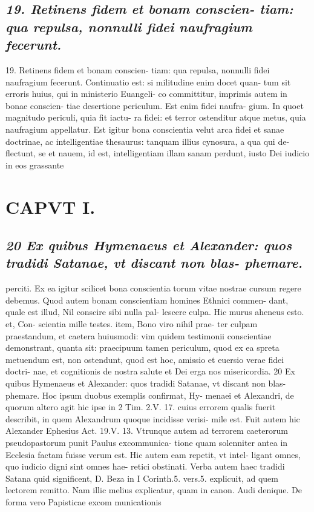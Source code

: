 \documentclass{article}
\begin{document}
\begin{pages}
\subsection*{\textit{19. Retinens fidem et bonam conscien- tiam: qua repulsa, nonnulli fidei naufragium fecerunt.}}19. Retinens fidem et bonam conscien- tiam: qua repulsa, nonnulli fidei naufragium fecerunt.  \pend\pstart Continuatio est: si militudine enim docet quan- tum sit erroris huius, qui in ministerio Euangeli- co committitur, imprimis autem in bonae conscien- tiae desertione periculum. Est enim fidei naufra- gium. In quoet magnitudo periculi, quia fit iactu- ra fidei: et terror ostenditur atque metus, quia naufragium appellatur. Est igitur bona conscientia velut arca fidei et sanae doctrinae, ac intelligentiae thesaurus: tanquam illius cynosura, a qua qui de- flectunt, se et nauem, id est, intelligentiam illam sanam perdunt, iusto Dei iudicio in eos grassante  \pend
\section*{CAPVT  I. }
\marginpar{[ p.37 ]}\pstart {}
{}
\subsection*{\textit{20 Ex quibus Hymenaeus et Alexander: quos tradidi Satanae, vt discant non blas- phemare.}}perciti. Ex ea igitur scilicet bona conscientia torum vitae nostrae cursum regere debemus. Quod autem bonam conscientiam homines Ethnici commen- dant, quale est illud, Nil conscire sibi nulla pal- lescere culpa. Hic murus aheneus esto. et, Con- scientia mille testes. item, Bono viro nihil prae- ter culpam praestandum, et caetera huiusmodi: vim quidem testimonii conscientiae demonstrant, quanta sit: praecipuum tamen periculum, quod ex ea spreta metuendum est, non ostendunt, quod est hoc, amissio et euersio verae fidei doctri- nae, et cognitionis de nostra salute et Dei erga nos misericordia. 20 Ex quibus Hymenaeus et Alexander: quos tradidi Satanae, vt discant non blas- phemare. Hoc ipsum duobus exemplis confirmat, Hy- menaei et Alexandri, de quorum altero agit hic ipse in 2 Tim. 2.V. 17. cuius errorem qualis fuerit describit, in quem Alexandrum quoque incidisse verisi- mile est. Fuit autem hic Alexander Ephesius Act. 19.V. 13. Vtrunque autem ad terrorem caeterorum pseudopastorum punit Paulus excommunica- tione quam solenniter antea in Ecclesia factam fuisse verum est. Hic autem eam repetit, vt intel- ligant omnes, quo iudicio digni sint omnes hae- retici obstinati. Verba autem haec tradidi Satana quid significent, D. Beza in I Corinth.5. vers.5. explicuit, ad quem lectorem remitto. Nam illic melius explicatur, quam in canon. Audi denique. De forma vero Papisticae excom municationis  \pend

\end{pages}
\end{document}
